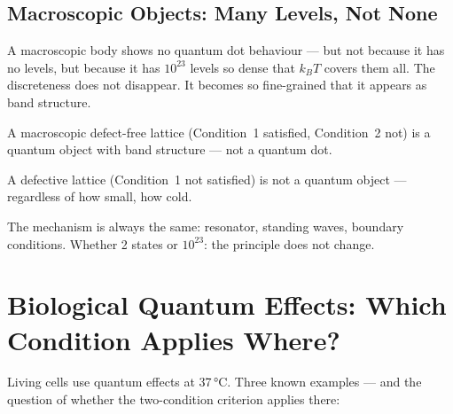 \subsection{Macroscopic Objects: Many Levels, Not None}

A macroscopic body shows no quantum dot behaviour ---
but not because it has no levels, but because it has
$10^{23}$ levels so dense that $k_BT$ covers them all.
The discreteness does not disappear. It becomes so fine-grained
that it appears as band structure.

\begin{keypoint}
A macroscopic defect-free lattice (Condition~1 satisfied,
Condition~2 not) is a quantum object with band structure ---
not a quantum dot.

A defective lattice (Condition~1 not satisfied)
is not a quantum object --- regardless of how small, how cold.

The mechanism is always the same: resonator, standing waves,
boundary conditions. Whether 2 states or $10^{23}$: the principle
does not change.
\end{keypoint}

\section{Biological Quantum Effects: Which Condition Applies Where?}
\label{sec:bio}

Living cells use quantum effects at 37\,°C.
Three known examples --- and the question of whether
the two-condition criterion applies there:

\begin{center}
\end{center}

